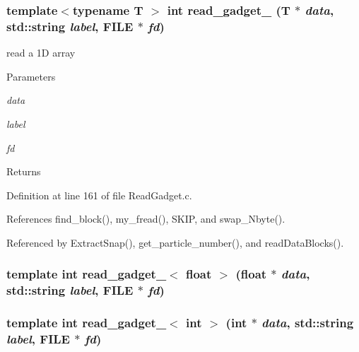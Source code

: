 \subsubsection[{read\_\-gadget\_\-1}]{\setlength{\rightskip}{0pt plus 5cm}template$<$typename T $>$ int read\_\-gadget\_ (T $\ast$ {\em data}, \/  std::string {\em label}, \/  FILE $\ast$ {\em fd})}\label{ReadGadget_8c_a82dcfc276c58b845497a7ac210b79fa4}
read a 1D array 
\begin{DoxyParams}{Parameters}
\item[{\em data}]\item[{\em label}]\item[{\em fd}]\end{DoxyParams}
\begin{DoxyReturn}{Returns}

\end{DoxyReturn}


Definition at line 161 of file ReadGadget.c.



References find\_\-block(), my\_\-fread(), SKIP, and swap\_\-Nbyte().



Referenced by ExtractSnap(), get\_\-particle\_\-number(), and readDataBlocks().

\subsubsection[{read\_\-gadget\_\-1$<$ float $>$}]{\setlength{\rightskip}{0pt plus 5cm}template int read\_\-gadget\_$<$ float $>$ (float $\ast$ {\em data}, \/  std::string {\em label}, \/  FILE $\ast$ {\em fd})}\label{ReadGadget_8c_a96e0e7ef9404aff1c1d5268061c22d71}
\subsubsection[{read\_\-gadget\_\-1$<$ int $>$}]{\setlength{\rightskip}{0pt plus 5cm}template int read\_\-gadget\_$<$ int $>$ (int $\ast$ {\em data}, \/  std::string {\em label}, \/  FILE $\ast$ {\em fd})}\label{ReadGadget_8c_a25edfa812b5ae7d4d1fd1b722cef6711}
